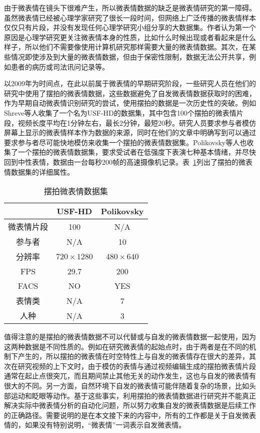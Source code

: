 由于微表情在镜头下很难产生，所以微表情数据的缺乏是微表情研究的第一障碍。虽然微表情已经被心理学家研究了很长一段时间，但网络上广泛传播的微表情样本仅仅只有片段，并没有发现任何心理学研究小组分享的大数据集。作者认为第一个原因是心理学研究更关注微表情本身的性质，比如什么时候出现或者看起来是什么样子，所以他们不需要像使用计算机研究那样需要大量的微表情数据。其次，在某些情况即使涉及到大量的微表情数据，但由于保密性限制，数据无法公开共享，例如患者的病历或司法讯问记录等。

以2009年为时间点，在此以前属于微表情的早期研究阶段，一些研究人员在他们的研究中使用了摆拍的微表情数据，这些数据避免了自发微表情数据获取时的困难，作为早期自动微表情识别研究的尝试，使用摆拍的数据是一次历史性的突破。例如Shreve等人收集了一个名为USF-HD的数据集，其中包含100个摆拍的微表情片段，视频长度平均在1分钟左右，最长2分钟，最短20秒。研究人员要求参与者模仿屏幕上显示的微表情样本作为数据的来源，同时在他们的文章中明确写到可以通过要求参与者尽可能快地模仿来收集一个摆拍的微表情数据集。Polikovsky等人也收集了一个摆拍的微表情数据集，要求受试者在低强度下表演七种基本情绪，并尽快回到中性表情，数据由一台每秒200帧的高速摄像机记录。表~\ref{tab2}列出了摆拍的微表情数据集的详细属性。

\begin{table}[!htbp]
\renewcommand\arraystretch{1.5}
\centering
\caption{摆拍微表情数据集}
\label{tab2}
\footnotesize%
\setlength{\tabcolsep}{5pt}%
\begin{tabular}{c|cc}
\hline
 & USF-HD & Polikovsky \\ \hline
微表情片段 & 100 & N/A \\
参与者 & N/A & 10 \\
分辨率 & $720\times1280$ & $480\times640$ \\
FPS & 29.7 & 200 \\
FACS & NO & YES \\
表情类 & N/A & 7 \\
人种 & N/A & 3 \\ \hline
\end{tabular}
\end{table}

值得注意的是摆拍的微表情数据不可以代替或与自发的微表情数据一起使用，因为这两种数据是不同性质的。例如在研究微表情的起始点时，由于两者是在不同的机制下产生的，所以摆拍的微表情在时空特性上与自发的微表情存在很大的差异，其次在研究视频的上下文时，由于模仿的表情与通过视频编辑生成的摆拍微表情片段通常在起止点很突兀，而且期间禁止其他无关的动作发生，这也与自发的微表情有很大的不同。另一方面，自然环境下自发的微表情可能伴随着复杂的场景，比如头部运动和眨眼等动作。基于这些事实，利用摆拍的微表情数据进行研究并不能真正解决实际中微表情分析的自动化问题，所以努力收集自发的微表情数据是后续工作的正确路径。需要说明的是在本文接下来的内容中，所有的工作都是关于自发微表情的，如果没有特别说明，“微表情”一词表示自发微表情。

